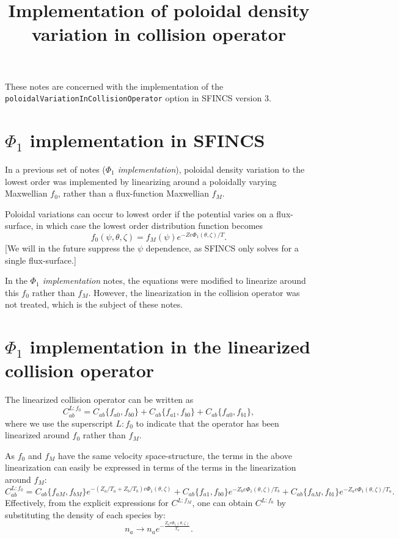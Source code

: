\documentclass[12pt]{article}
\title{Implementation of poloidal density variation in collision operator}
\begin{document}
\titlepage

\maketitle

These notes are concerned with the implementation of the \texttt{poloidalVariationInCollisionOperator} option in SFINCS version 3.

\section*{$\Phi_1$ implementation in SFINCS}
In a previous set of notes (\emph{$\Phi_1$ implementation}), poloidal density variation to the lowest order was implemented by linearizing around a poloidally varying Maxwellian $f_0$, rather than a flux-function Maxwellian $f_M$.

Poloidal variations can occur to lowest order if the potential varies on a flux-surface, in which case the lowest order distribution function becomes
\begin{equation}
f_0(\psi,\theta,\zeta) = f_M(\psi) e^{-Ze\Phi_1(\theta,\zeta)/T}.
\end{equation}
[We will in the future suppress the $\psi$ dependence, as SFINCS only solves for a single flux-surface.]

In the \emph{$\Phi_1$ implementation} notes, the equations were modified to linearize around this $f_0$ rather than $f_M$. However, the linearization in the collision operator was not treated, which is the subject of these notes.


\section*{$\Phi_1$ implementation in the linearized collision operator}
The linearized collision operator can be written as
\begin{equation}
C^{L:f_0}_{ab} = C_{ab}\{f_{a0},f_{b0}\} +  C_{ab}\{f_{a1},f_{b0}\} +  C_{ab}\{f_{a0},f_{b1}\},
\end{equation}
where we use the superscript $L:f_0$ to indicate that the operator has been linearized around $f_0$ rather than $f_M$. 

As $f_0$ and $f_M$ have the same velocity space-structure, the terms in the above linearization can easily be expressed in terms of the terms in the linearization around $f_M$:
\begin{equation}
C^{L:f_0}_{ab} =  C_{ab}\{f_{aM},f_{bM}\} e^{-(Z_a/T_a + Z_b/T_b) e\Phi_1(\theta,\zeta)} +  C_{ab}\{f_{a1},f_{b0}\} e^{-Z_b e\Phi_1(\theta,\zeta)/T_b} +  C_{ab}\{f_{aM},f_{b1}\} e^{-Z_a e\Phi_1(\theta,\zeta)/T_a}.
\end{equation}
Effectively, from the explicit expressions for $C^{L:f_M}$, one can obtain $C^{L:f_0}$ by substituting the density of each species by:
\begin{equation}
n_a \to n_a e^{-\frac{Z_a e\Phi_1(\theta,\zeta)}{T_a}}. \label{eq:denssub}
\end{equation}
\end{document}
